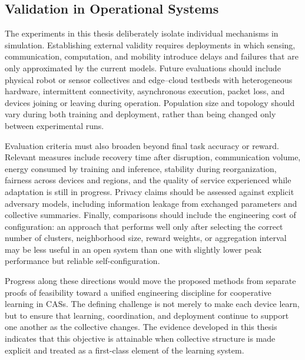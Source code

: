 \subsection{Validation in Operational Systems}

The experiments in this thesis deliberately isolate individual mechanisms in simulation. 
%
Establishing external validity requires deployments in which sensing, communication, computation, 
 and mobility introduce delays and failures that are only approximated by the current models.
%
Future evaluations should include physical robot or sensor collectives 
 and edge--cloud testbeds with heterogeneous hardware, intermittent connectivity,
 asynchronous execution, packet loss, and devices joining or leaving during operation. 
% 
Population size and topology should vary during both training 
 and deployment, rather than being changed only between experimental runs.

Evaluation criteria must also broaden beyond final task accuracy or reward.
%
Relevant measures include recovery time after disruption, communication volume,
 energy consumed by training and inference, stability during reorganization,
 fairness across devices and regions, and the quality of service experienced 
 while adaptation is still in progress. 
% 
Privacy claims should be assessed against explicit adversary models, 
 including information leakage from exchanged parameters and collective summaries. 
% 
Finally, 
 comparisons should include the engineering cost of configuration: 
 an approach that performs well only after selecting the correct number of clusters, 
 neighborhood size, reward weights, or aggregation interval may be less useful 
 in an open system than one with slightly lower peak performance but reliable self-configuration.

Progress along these directions would move the proposed methods from separate proofs of feasibility 
 toward a unified engineering discipline for cooperative learning in \glspl{CAS}. 
% 
The defining challenge is not merely to make each device learn, 
 but to ensure that learning, coordination, and deployment continue 
 to support one another as the collective changes. 
%
The evidence developed in this thesis indicates that this objective is attainable 
 when collective structure is made explicit and treated as a first-class element of the learning system.
